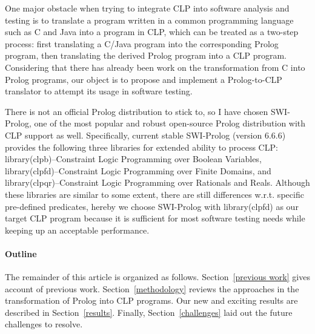 \documentclass[12pt]{article}
\begin{document}
One major obstacle when trying to integrate CLP into software analysis and testing is to translate a program written in a common programming language such as C and Java into a program in CLP, which can be treated as a two-step process: first translating a C/Java program into the corresponding Prolog program, then translating the derived Prolog program into a CLP program. Considering that there has already been work on the transformation from C into Prolog programs, our object is to propose and implement a Prolog-to-CLP translator to attempt its usage in software testing.

There is not an official Prolog distribution to stick to, so I have chosen SWI-Prolog, one of the most popular and robust open-source Prolog distribution with CLP support as well. Specifically, current stable SWI-Prolog (version 6.6.6) provides the following three libraries for extended ability to process CLP: library(clpb)--Constraint Logic Programming over Boolean Variables, library(clpfd)--Constraint Logic Programming over Finite Domains, and library(clpqr)--Constraint Logic Programming over Rationals and Reals. Although these libraries are similar to some extent, there are still differences w.r.t. specific pre-defined predicates, hereby we choose SWI-Prolog with library(clpfd) as our target CLP program because it is sufficient for most software testing needs while keeping up an acceptable performance.  

\paragraph{Outline}
The remainder of this article is organized as follows.
Section~\ref{previous work} gives account of previous work.
Section~\ref{methodology} reviews the approaches in the transformation of Prolog into CLP programs.
Our new and exciting results are described in Section~\ref{results}.
Finally, Section~\ref{challenges} laid out the future challenges to resolve.
\end{document}
